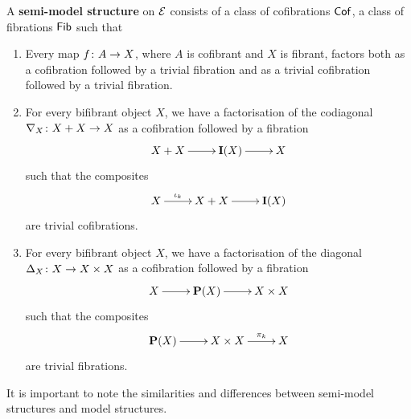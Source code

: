 \documentclass[reqno,10pt,a4paper,oneside,draft]{amsart}
\begin{document}
\begin{definition} A {\bf semi-model structure} on $\cal{E}$ consists of a class of cofibrations $\Cof$, a class of
fibrations $\Fib$ such that
\begin{enumerate}[(SM1)]
\item Every map $f \co A \to X$, where $A$ is cofibrant and $X$ is fibrant, factors both as a
cofibration followed by a trivial fibration and as a trivial cofibration followed by a trivial fibration.
\item For every bifibrant object $X$, we have a factorisation of the codiagonal $\nabla_X \co 
X + X \to X$ as a cofibration followed by a fibration 
\[
\xymatrix{X + X \ar[r] &  {\bf I}(X) \ar[r] & X}
\]
such that the composites 
\[
\xymatrix{X \ar[r]^-{\iota_k}  & X+X \ar[r] & {\bf I }(X)}
\]
are trivial cofibrations.
\item For every bifibrant object $X$, we have a factorisation of the diagonal $\Delta_X \co X \to 
X \times X$ as a cofibration followed by a fibration
\[
\xymatrix{X  \ar[r]  & {\bf P}(X) \ar[r] & X \times X }
 \]
 such that the composites
\[
\xymatrix{ {\bf P}(X) \ar[r] &  X \times X \ar[r]^-{\pi_k} &  X }
\]
are trivial fibrations.
\end{enumerate}
\end{definition}

\bigskip



It is important to note the similarities and differences between semi-model structures and model
structures. 



\nocite{*}







\end{document}
